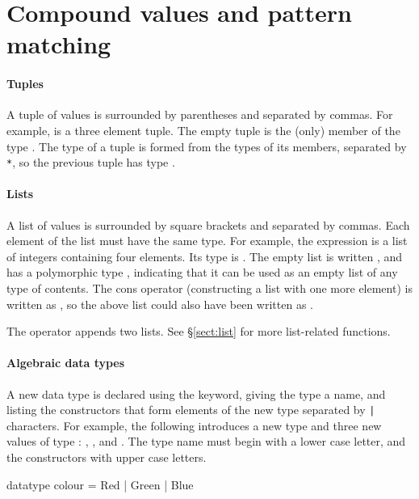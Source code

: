 \documentclass[12pt,a4paper]{book}
\begin{document}
\section{Compound values and pattern matching}
\label{sect:compound}

\paragraph{Tuples} A tuple of values is surrounded by parentheses and separated by commas. For example,  is a three element tuple. The empty tuple \smlinline{()} is the (only) member of the type . The type of a tuple is formed from the types of its members, separated by \texttt{*}, so the previous tuple has type .

\paragraph{Lists} A list of values is surrounded by square brackets and separated by commas. Each element of the list must have the same type. For example, the expression \smlinline{[1,2,3,4]} is a list of integers containing four elements. Its type is . The empty list is written \smlinline{[]}, and has a polymorphic type , indicating that it can be used as an empty list of any type of contents. The cons operator (constructing a list with one more element) is written as \smlinline{::}, so the above list could also have been written as .

The  operator appends two lists. See \S\ref{sect:list} for more list-related functions.

\paragraph{Algebraic data types}

A new data type is declared using the  keyword, giving the
type a name, and listing the constructors that form elements of the new type
separated by \texttt{|} characters. For example, the following introduces a new type  and three new values of type : , , and .
The type name must begin with a lower case letter, and the constructors with upper case letters.
\begin{smlcode}
datatype colour = Red | Green | Blue
\end{smlcode}
\end{document}
